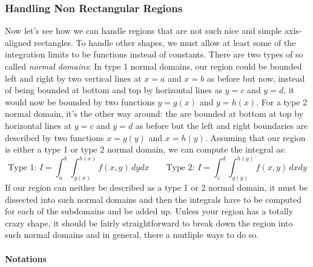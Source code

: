 \subsubsection{Handling Non Rectangular Regions}
Now let's see how we can handle regions that are not such nice and simple axis-aligned rectangles. To handle other shapes, we must allow at least some of the integration limits to be functions instead of constants. There are two types of so called \emph{normal domains}: In type 1 normal domains, our region could be bounded left and right by two vertical lines at $x = a$ and $x = b$ as before but now, instead of being bounded at bottom and top by horizontal lines as $y = c$ and $y = d$, it would now be bounded by two functions $y = g(x)$ and $y = h(x)$. For a type 2 normal domain, it's the other way around: the are bounded at bottom at top by horizontal lines at $y = c$ and $y = d$  as before but the left and right boundaries are described by two functions $x = g(y)$ and $x = h(y)$. Assuming that our region is either a type 1 or type 2 normal domain, we can compute the integral as:
\begin{equation}
\text{Type 1: } I = \int_a^b \int_{g(x)}^{h(x)} f(x,y) \, dy dx   \qquad
\text{Type 2: } I = \int_c^d \int_{g(y)}^{h(y)} f(x,y) \, dx dy
\end{equation}
If our region can neither be described as a type 1 or 2 normal domain, it must be dissected into such normal domains and then the integrals have to be computed for each of the subdomains and be added up. Unless your region has a totally crazy shape, it should be fairly straightforward to break down the region into such normal domains and in general, there a mutliple ways to do so. 


\paragraph{Notations}






